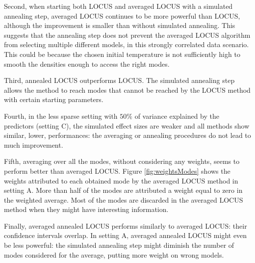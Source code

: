 \documentclass[a4paper, 11pt]{report}
\numberwithin{equation}{chapter}
\begin{document}
Second, when starting both LOCUS and averaged LOCUS with a simulated annealing step, averaged LOCUS continues to be more powerful than LOCUS, although the improvement is smaller than without simulated annealing. This suggests that the annealing step does not prevent the averaged LOCUS algorithm from selecting multiple different models, in this strongly correlated data scenario. This could be because the chosen initial temperature is not sufficiently high to smooth the densities enough to access the right modes.

Third, annealed LOCUS outperforms LOCUS. The simulated annealing step allows the method to reach modes that cannot be reached by the LOCUS method with certain starting parameters. 

Fourth, in the less sparse setting with $50\%$ of variance explained by the predictors (setting C), the simulated effect sizes are weaker and all methods show similar, lower, performances: the averaging or annealing procedures do not lead to much improvement.

Fifth, averaging over all the modes, without considering any weights, seems to perform better than averaged LOCUS. Figure \ref{fig:weightsModes} shows the weights attributed to each obtained mode by the averaged LOCUS method in setting A. More than half of the modes are attributed a weight equal to zero in the weighted average. Most of the modes are discarded in the averaged LOCUS method when they might have interesting information.

Finally, averaged annealed LOCUS performs similarly to averaged LOCUS: their confidence intervals overlap. In setting A, averaged annealed LOCUS might even be less powerful: the simulated annealing step might diminish the number of modes considered for the average, putting more weight on wrong models.
\end{document}
